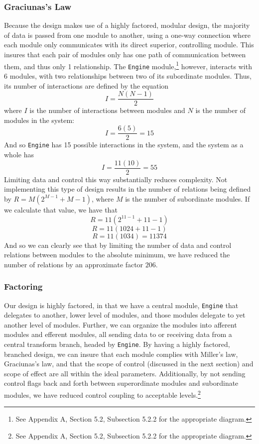 \documentclass{article}
\begin{document}
		\subsubsection{Graciunas's Law}
			Because the design makes use of a highly factored, modular design, the majority of data is passed from one module to another, using a one-way connection where each module only communicates with its direct superior, controlling module. This insures that each pair of modules only has one path of communication between them, and thus only 1 relationship. The \texttt{Engine} module,\footnote{See Appendix A, Section 5.2, Subsection 5.2.2 for the appropriate diagram.} however, interacts with 6 modules, with two relationships between two of its subordinate modules. Thus, its number of interactions are defined by the equation $$I = \frac{N(N - 1)}{2}$$
			where $I$ is the number of interactions between modules and $N$ is the number of modules in the system:
			$$I = \frac{6(5)}{2} = 15$$
			And so \texttt{Engine} has 15 possible interactions in the system, and the system as a whole has 
			$$I = \frac{11(10)}{2} = 55$$
			Limiting data and control this way substantially reduces complexity. Not implementing this type of design results in the number of relations being defined by $R = M(2^{M-1} + M - 1)$, where $M$ is the number of subordinate modules. If we calculate that value, we have that
			$$R = 11(2^{11-1} + 11 - 1)$$
			$$R = 11(1024 + 11 - 1)$$
			$$R = 11(1034) = 11374$$
			And so we can clearly see that by limiting the number of data and control relations between modules to the absolute minimum, we have reduced the number of relations by an approximate factor $206$. 
		\subsubsection{Factoring}
			Our design is highly factored, in that we have a central module, \texttt{Engine} that delegates to another, lower level of modules, and those modules delegate to yet another level of modules. Further, we can organize the modules into afferent modules and efferent modules, all sending data to or receiving data from a central transform branch, headed by \texttt{Engine}. By having a highly factored, branched design, we can insure that each module complies with Miller's law, Graciunas's law, and that the scope of control (discussed in the next section) and scope of effect are all within the ideal parameters. Additionally, by not sending control flags back and forth between superordinate modules and subordinate modules, we have reduced control coupling to acceptable levels.\footnote{See Appendix A, Section 5.2, Subsection 5.2.2 for the appropriate diagram.}  
\end{document}
